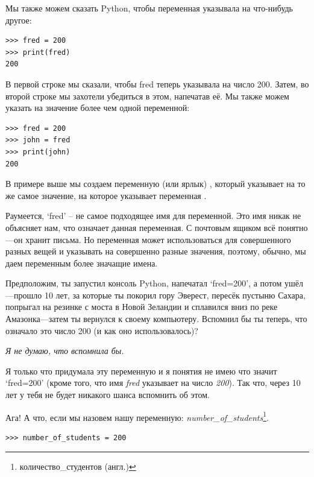 Мы также можем сказать Python, чтобы переменная  указывала на что-нибудь другое:

\begin{listing}
\begin{verbatim}
>>> fred = 200
>>> print(fred)
200
\end{verbatim}
\end{listing}

\noindent
В первой строке мы сказали, чтобы fred теперь указывала на число 200. Затем, во второй строке мы захотели убедиться в этом, напечатав её. Мы также можем указать на значение более чем одной переменной:

\begin{listing}
\begin{verbatim}
>>> fred = 200
>>> john = fred
>>> print(john)
200
\end{verbatim}
\end{listing}

В примере выше мы создаем переменную (или ярлык) , который указывает на то же самое значение, на которое указывает переменная .

Раумеется, `fred' -- не самое подходящее имя для переменной.  Это имя никак не объясняет нам, что означает данная переменная.  С почтовым ящиком всё понятно---он хранит письма. Но переменная может использоваться для совершенного разных вещей и указывать на совершенно разные значения, поэтому, обычно, мы даем переменным более значащие имена.
\par
Предположим, ты запустил консоль Python, напечатал `fred=200', а потом ушёл---прошло 10 лет, за которые ты покорил гору Эверест, пересёк пустыню Сахара, попрыгал на резинке с моста в Новой Зеландии и сплавился вниз по реке Амазонка---затем ты вернулся к своему компьютеру.  Вспомнил бы ты теперь, что означало это число 200 (и как оно использовалось)?

\noindent
\emph{Я не думаю, что вспомнила бы.}

\noindent
Я только что придумала эту переменную и я понятия не имею что значит `fred=200' (кроме того, что имя \emph{fred} указывает на число \emph{200}).  Так что, через 10 лет у тебя не будет никакого шанса вспомнить об этом.
\par
Ага!  А что, если мы назовем нашу переменную: \emph{number\_of\_students}\footnote{количество\_студентов (англ.)}.

\begin{listing}
\begin{verbatim}
>>> number_of_students = 200
\end{verbatim}
\end{listing}

